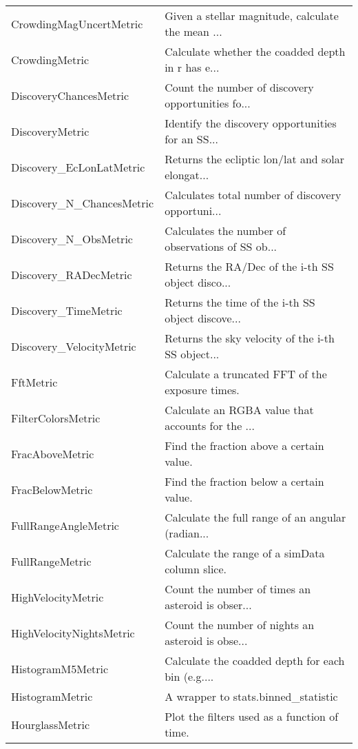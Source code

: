 \begin{tabular}{ll}
       CrowdingMagUncertMetric &  Given a stellar magnitude, calculate the mean ... \\
                CrowdingMetric &  Calculate whether the coadded depth in r has e... \\
        DiscoveryChancesMetric &  Count the number of discovery opportunities fo... \\
               DiscoveryMetric &  Identify the discovery opportunities for an SS... \\
      Discovery\_EcLonLatMetric &  Returns the ecliptic lon/lat and solar elongat... \\
     Discovery\_N\_ChancesMetric &  Calculates total number of discovery opportuni... \\
         Discovery\_N\_ObsMetric &  Calculates the number of observations of SS ob... \\
         Discovery\_RADecMetric &  Returns the RA/Dec of the i-th SS object disco... \\
          Discovery\_TimeMetric &  Returns the time of the i-th SS object discove... \\
      Discovery\_VelocityMetric &  Returns the sky velocity of the i-th SS object... \\
                     FftMetric &   Calculate a truncated FFT of the exposure times. \\
            FilterColorsMetric &  Calculate an RGBA value that accounts for the ... \\
               FracAboveMetric &           Find the fraction above a certain value. \\
               FracBelowMetric &           Find the fraction below a certain value. \\
          FullRangeAngleMetric &  Calculate the full range of an angular (radian... \\
               FullRangeMetric &     Calculate the range of a simData column slice. \\
            HighVelocityMetric &  Count the number of times an asteroid is obser... \\
      HighVelocityNightsMetric &  Count the number of nights an asteroid is obse... \\
             HistogramM5Metric &  Calculate the coadded depth for each bin (e.g.... \\
               HistogramMetric &                A wrapper to stats.binned\_statistic \\
               HourglassMetric &       Plot the filters used as a function of time. \\

\end{tabular}
